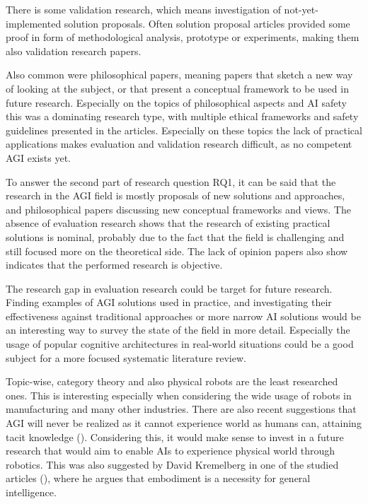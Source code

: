 \documentclass[utf8,english]{gradu3}
\begin{document}
There is some validation research, which means investigation of
not-yet-implemented solution proposals. Often solution proposal articles
provided some proof in form of methodological analysis, prototype or
experiments, making them also validation research papers.

Also common were philosophical papers, meaning papers that sketch a new way of
looking at the subject, or that present a conceptual framework to be used in
future research. Especially on the topics of philosophical aspects and AI safety
this was a dominating research type, with multiple ethical frameworks and safety
guidelines presented in the articles. Especially on these topics the lack of
practical applications makes evaluation and validation research difficult, as no
competent AGI exists yet.

To answer the second part of research question RQ1, it can be said that the
research in the AGI field is mostly proposals of new solutions and approaches,
and philosophical papers discussing new conceptual frameworks and views. The
absence of evaluation research shows that the research of existing practical
solutions is nominal, probably due to the fact that the field is challenging and
still focused more on the theoretical side. The lack of opinion papers
also show indicates that the performed research is objective.

The research gap in evaluation research could be target for future research.
Finding examples of AGI solutions used in practice, and investigating their
effectiveness against traditional approaches or more narrow AI solutions would
be an interesting way to survey the state of the field in more detail.
Especially the usage of popular cognitive architectures in real-world situations
could be a good subject for a more focused systematic literature review. 

Topic-wise, category theory and also physical robots are the least researched
ones. This is interesting especially when considering the wide usage of robots
in manufacturing and many other industries. There are also recent suggestions
that AGI will never be realized as it cannot experience world as humans can,
attaining tacit knowledge (\cite{fjelland2020why}). Considering this, it would
make sense to invest in a future research that would aim to enable AIs to
experience physical world through robotics. This was also suggested by David
Kremelberg in one of the studied articles (\cite{kremelberg2019embodiment}),
where he argues that embodiment is a necessity for general intelligence.
\end{document}
